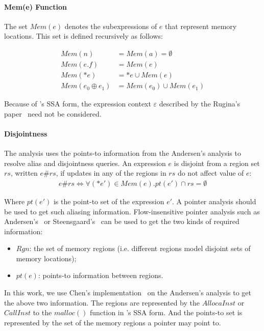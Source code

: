 \paragraph{Mem(e) Function} 

The set $Mem(e)$ denotes the subexpressions of $e$ that represent memory 
locations. This set is defined recursively as follows:

\begin{align*}
  Mem(n) &= Mem(a)=\emptyset \\
Mem(e.f) &= Mem(e) \\
 Mem(*e) &={*e}\cup Mem(e) \\
Mem(e_0 \oplus e_1) &= Mem(e_0)\cup Mem(e_1)
\end{align*}


Because of \llvm's SSA form, the expression context $\varepsilon$ described 
by the Rugina's paper~\cite{rugina} need not be considered.

\paragraph{Disjointness}

The analysis uses the points-to information from the Andersen's analysis 
to resolve alias and disjointness queries. 
An expression $e$ is disjoint from a region set 
$rs$, written $e\#rs$, if updates in any of the regions in $rs$ do not 
affect value of $e$:
\begin{align*}
e\#rs \iff \forall(*e')\in Mem(e). pt(e')\cap rs=\emptyset
\end{align*}

Where $pt(e')$ is the point-to set of the expression $e'$. 
A pointer analysis should be used to get such aliasing information. 
Flow-insensitive pointer analysis such as Andersen's~\cite{andersen} or 
Steensgaard's~\cite{steensgaard} can be used to get the two kinds of 
required information:

\begin{itemize}
  \item $Rgn$: the set of memory regions 
    (i.e. different regions model disjoint sets of memory locations);
  \item $pt(e)$: points-to information between regions.
\end{itemize}

In this work, we use Chen's implementation~\cite{chen} on the Andersen's 
analysis to get the above two information.
The regions are represented by the $AllocaInst$ or $CallInst$ to the $malloc()$ 
function in \llvm's SSA form. And the points-to set is represented by the 
set of the memory regions a pointer may point to.



